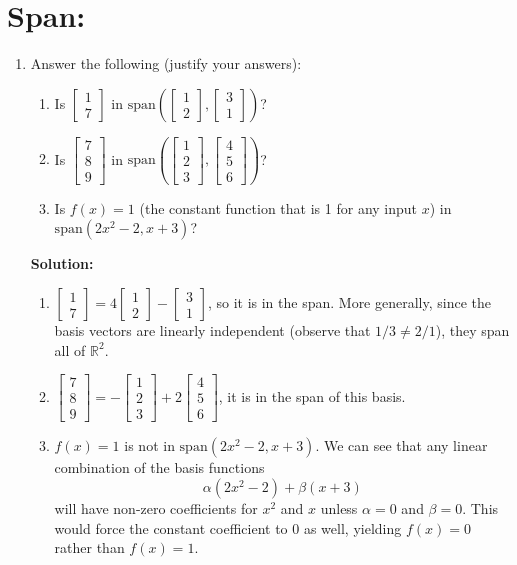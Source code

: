 \documentclass[]{article}
\newcommand{\R}{\mathbb{R}}
\newcommand{\bbm}{\begin{bmatrix}}
\newcommand{\ebm}{\end{bmatrix}}
\newcommand{\vspan}{\mathrm{span}}
\newcommand{\solution}{\vskip 0.5cm \textbf{\large Solution:} \\}
\begin{document}
\section*{Span:}
\begin{enumerate}[resume]
	\item Answer the following (justify your answers):
	\begin{enumerate}
	\item Is $\bbm 1\\7\ebm$ in $\vspan \left(\bbm 1\\2 \ebm,\bbm 3\\1 \ebm \right)$?
		\item Is $\bbm 7\\8\\9\ebm$ in $\vspan\left(\bbm 1\\2\\3 \ebm,\bbm 4\\5\\6 \ebm \right)$?
		\item Is $f(x)=1$ (the constant function that is 1 for any input $x$) in $\vspan(2x^2-2, x+3)$?
	\end{enumerate}
    
	\solution
	\begin{enumerate}
	\item
      $\bbm 1\\7\ebm = 4 \bbm 1\\2 \ebm - \bbm 3\\1 \ebm$, so it is in
      the span. More generally, since the basis vectors are linearly
      independent (observe that $1/3 \neq 2/1$), they span all of $\R^2$.
      
	\item $\bbm 7\\8\\9\ebm = -\bbm 1\\2\\3 \ebm + 2 \bbm 4\\5\\6
      \ebm$, it is in the span of this basis.

	\item $f(x) = 1$ is not in $\vspan(2x^2-2, x+3)$. We can see that
      any linear combination of the basis functions
      \[
      \alpha(2x^2 - 2) + \beta(x + 3)
      \]
      will have non-zero coefficients for $x^2$ and $x$ unless $\alpha
      = 0$ and $\beta = 0$. This would force the constant coefficient
      to 0 as well, yielding $f(x) = 0$ rather than $f(x) = 1$.
	\end{enumerate}
\end{enumerate}
\end{document}
